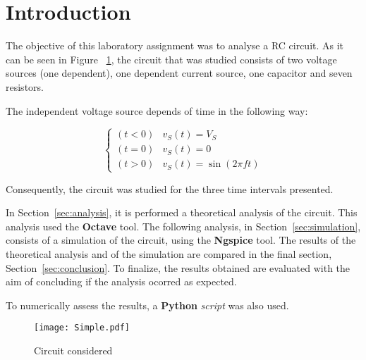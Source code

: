 \section{Introduction}
\label{sec:introduction}

The objective of this laboratory assignment was to analyse a RC circuit. As it can be seen in Figure ~\ref{circuit}, the circuit that was studied consists of two voltage sources (one dependent), one dependent current source, one capacitor and seven resistors.

The independent voltage source depends of time in the following way:

\begin{equation}
  \begin{cases}
    (t < 0) & v_S(t) = V_S \\
    (t = 0) & v_S(t) = 0 \\
    (t > 0) & v_S(t) = \sin(2\pi ft)
  \end{cases}
\end{equation}

Consequently, the circuit was studied for the three time intervals presented.

In Section~\ref{sec:analysis}, it is performed a theoretical analysis of the circuit. This analysis used the {\bf Octave} tool. The following analysis, in Section~\ref{sec:simulation}, consists of a simulation of the circuit, using the {\bf Ngspice} tool. The results of the theoretical analysis and of the simulation are compared in the final section, Section~\ref{sec:conclusion}. To finalize, the results obtained are evaluated with the aim of concluding if the analysis ocorred as expected.

To numerically assess the results, a {\bf Python} {\it script} was also used.



\begin{figure}[H]
  \centering
  \texttt{[image: Simple.pdf]}
  \caption{Circuit considered}
  \label{circuit}
\end{figure}

